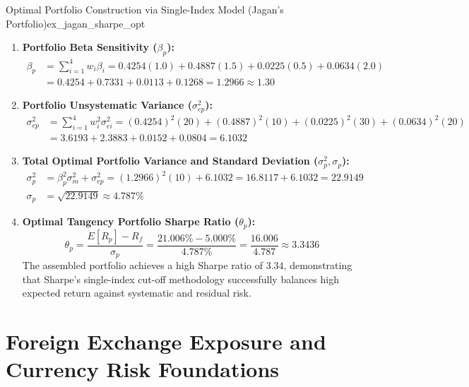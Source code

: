 \begin{example}{Optimal Portfolio Construction via Single-Index Model (Jagan's Portfolio)}{ex_jagan_sharpe_opt}
\begin{enumerate}[leftmargin=*, itemsep=3pt]
    \item \textbf{Portfolio Beta Sensitivity ($\beta_p$):}
    \begin{align*}
        \beta_p &= \sum_{i=1}^4 w_i \beta_i = 0.4254(1.0) + 0.4887(1.5) + 0.0225(0.5) + 0.0634(2.0) \\
                &= 0.4254 + 0.7331 + 0.0113 + 0.1268 = \mathbf{1.2966} \approx \mathbf{1.30}
    \end{align*}

    \item \textbf{Portfolio Unsystematic Variance ($\sigma_{ep}^2$):}
    \begin{align*}
        \sigma_{ep}^2 &= \sum_{i=1}^4 w_i^2 \sigma_{ei}^2 = (0.4254)^2(20) + (0.4887)^2(10) + (0.0225)^2(30) + (0.0634)^2(20) \\
                      &= 3.6193 + 2.3883 + 0.0152 + 0.0804 = \mathbf{6.1032}
    \end{align*}

    \item \textbf{Total Optimal Portfolio Variance and Standard Deviation ($\sigma_p^2, \sigma_p$):}
    \begin{align*}
        \sigma_p^2 &= \beta_p^2 \sigma_m^2 + \sigma_{ep}^2 = (1.2966)^2(10) + 6.1032 = 16.8117 + 6.1032 = \mathbf{22.9149} \\[0.3em]
        \sigma_p   &= \sqrt{22.9149} \approx \mathbf{4.787\%}
    \end{align*}

    \item \textbf{Optimal Tangency Portfolio Sharpe Ratio ($\theta_p$):}
    \begin{equation*}
        \theta_p = \frac{E[R_p] - R_f}{\sigma_p} = \frac{21.006\% - 5.000\%}{4.787\%} = \frac{16.006}{4.787} \approx \mathbf{3.3436}
    \end{equation*}
    The assembled portfolio achieves a high Sharpe ratio of $3.34$, demonstrating that Sharpe's single-index cut-off methodology successfully balances high expected return against systematic and residual risk.
\end{enumerate}
\end{example}

\newpage
\section{Foreign Exchange Exposure and Currency Risk Foundations}


